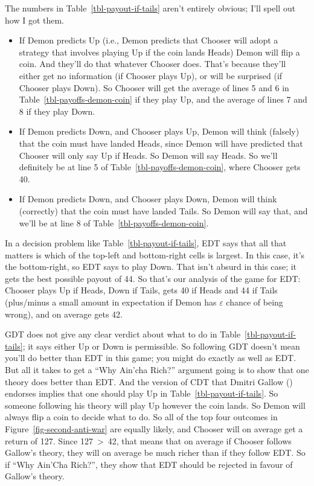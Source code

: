 \documentclass[
  12pt,
  letterpaper,
  DIV=11,
  numbers=noendperiod]{scrreprt}
\providecommand{\tightlist}{%
  \setlength{\itemsep}{0pt}\setlength{\parskip}{0pt}}\usepackage{longtable,booktabs,array}
\begin{document}
The numbers in Table~\ref{tbl-payout-if-tails} aren't entirely obvious;
I'll spell out how I got them.

\begin{itemize}
\tightlist
\item
  If Demon predicts Up (i.e., Demon predicts that Chooser will adopt a
  strategy that involves playing Up if the coin lands Heads) Demon will
  flip a coin. And they'll do that whatever Chooser does. That's because
  they'll either get no information (if Chooser plays Up), or will be
  surprised (if Chooser plays Down). So Chooser will get the average of
  lines 5 and 6 in Table~\ref{tbl-payoffs-demon-coin} if they play Up,
  and the average of lines 7 and 8 if they play Down.
\item
  If Demon predicts Down, and Chooser plays Up, Demon will think
  (falsely) that the coin must have landed Heads, since Demon will have
  predicted that Chooser will only say Up if Heads. So Demon will say
  Heads. So we'll definitely be at line 5 of
  Table~\ref{tbl-payoffs-demon-coin}, where Chooser gets 40.
\item
  If Demon predicts Down, and Chooser plays Down, Demon will think
  (correctly) that the coin must have landed Tails. So Demon will say
  that, and we'll be at line 8 of Table~\ref{tbl-payoffs-demon-coin}.
\end{itemize}

In a decision problem like Table~\ref{tbl-payout-if-tails}, EDT says
that all that matters is which of the top-left and bottom-right cells is
largest. In this case, it's the bottom-right, so EDT says to play Down.
That isn't absurd in this case; it gets the best possible payout of 44.
So that's our analysis of the game for EDT: Chooser plays Up if Heads,
Down if Tails, gets 40 if Heads and 44 if Tails (plus/minus a small
amount in expectation if Demon has \(\varepsilon\) chance of being
wrong), and on average gets 42.

GDT does not give any clear verdict about what to do in
Table~\ref{tbl-payout-if-tails}; it says either Up or Down is
permissible. So following GDT doesn't mean you'll do better than EDT in
this game; you might do exactly as well as EDT. But all it takes to get
a ``Why Ain'cha Rich?'' argument going is to show that one theory does
better than EDT. And the version of CDT that Dmitri Gallow
() endorses implies that one should play
Up in Table~\ref{tbl-payout-if-tails}. So someone following his theory
will play Up however the coin lands. So Demon will always flip a coin to
decide what to do. So all of the top four outcomes in
Figure~\ref{fig-second-anti-war} are equally likely, and Chooser will on
average get a return of 127. Since 127~\textgreater~42, that means that
on average if Chooser follows Gallow's theory, they will on average be
much richer than if they follow EDT. So if ``Why Ain'Cha Rich?'', they
show that EDT should be rejected in favour of Gallow's theory.
\end{document}
